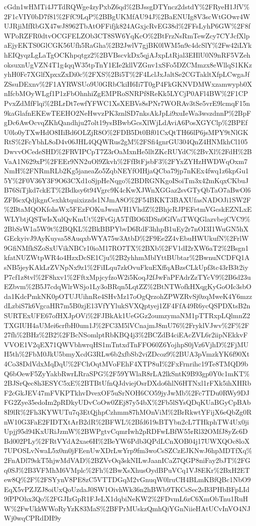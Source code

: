 \documentclass[12pt,letterpaper]{article}
\begin{document}
{\begin{landscape}
\begin{center}
cGdn1wHMTi4J7TdRQWge4zyPxbZ6qd\%2BJssgDTYncz2dstdY\%2FRyeH1JfV\%2F1cVIY0bD7f81\%2FfC9LqP\%2BBgUKMfAU94J\%2BaENUIg8V3scWtGOwr4WUJRjiMfRbGX47wJ8962TbAtOFFifjk824AGxjcRvEG38d\%2FFsLyhP6GW\%2F8fWPoRZFR0dtvOCGFELZOb3CT8SW6YqKcO\%2BtFrzNsRmTewZcy7CYJcfXlpaEjyEKTS0GlCGK56Ufh5RaGha\%2B2JwlV7gjBK0lWM5n9c4dcSlY\%2Fw42iLYkhEIQyqzLgLaTgOCKhpqtgz2\%2BVBscvkDx5qjAJxpLtRjal3EHlU0N9nRF5VZehoksuxnUgVZN4T1g4qqW35tpTnY1EIe2kllVZGnv1xSFo5DZCMmzx8eWllqS1KKzyhH0Fc7XGlfXpxxZxDi0c\%2FXS\%2Bi5T\%2F4LclJxJaltSe2CGTakltXfpLCwgaJfZSsuDExnv\%2F1AYRWSUo9U0GRbCkiH6Ii7T0gP4FkGKNVDMWxzamwypb0XnIfcbMOyWLgf1P1zFbOhnhiZgEMPRoSNRPf8ReKk5LYCjP0AFl4BW\%2F1CPPvxZdMfFlqi\%2BLrDt7ewfYFWC1XsXEBVs8sPNr7WORAv3tSe5vrE9lcmqF15n9kaGlafnEKEwTEEHO2NeHwvzPK3znlSD7nksAkJpLi9xuIeWa3wszdnnP\%2BpFgDc6AwOcvqZKhQandhju27olt19ysBBwbGcsXlWjLdAviA6PosXGYClp\%2BPEfU0lo0yTXwHdO8IIiBd6OLZjR8O\%2FDB5Dt0Bf01CxQtTH66lP6jsMPY9tNlGKRtS\%2FcYbhL8oD4v06JHL4QQWRus2gM\%2FSfi4gnrGU304QnZ4HNMkhCl105DwvvOCedeSHD\%2FRVIPCpT7Z3rOaMxnHe5lltZKcRUYdC\%2BvXl\%2FdH\%2BVaA1N629xP\%2FEEr9NN2uOl9Zkvh\%2FfBtFjsbF3\%2FYxZYHzHWDWqOxm7NmH\%2FNRmRLb2Kg5janeaZo5ZqbNEYfOIHjaQCba79jp7nKEx4fwq1z6kpGu15Y\%2F0V36Y3F9O63CXd1oSjpHeNqgo\%2BDRGNKgoISoiTm3x42mKqxCKbuJB76SiTjkd7ckET\%2Bdksy6t94Vgrc9K4cKwXJWnXGGaz2svGTyQbTaO7aBwOl6ZFI6cxQdjkgnCexhktquixizzds1NJmA8O\%2F54BKKT3BAXUfasNADOJi1SW2F\%2BtaMQOKfohsWx5FEzFOKuJwsnVH1VhdZ\%2BhjcRJPEFetmVGcskEZNLxEWLYbtjQSTwIsXulQvKmUt\%2FvGjA5TfBO63DSn0GfVaiTWQGlazvbejCVC9\%2BbSrW1a5W9t\%2BQKL\%2BkBBPYbvD6RdF3hhpB1uEy2r7nOI3I1WuGN5hXGEckyivJ9AyKuysa58AuqxbWYA75w3AtbD\%2F9Ee2Z4vEbuHWUkufN\%2FrlW9GfiNMfkSZoSxUVikNBCr10ioM17RO7TX\%2BXb\%2FV1dI2rXW6aT2\%2Bsgn1kfatNUZWtpWR4o4HzxDcSE1Cju\%2B2yhhmMblYttBUbtar\%2BwnuNCDFQ1AsNB5jeyKAkLrZVNpNx9z1\%2FiILqu7zkOvuFkuEXffqABzsCLkUpf3tc43rB3t2iyP7cf1z8tvl\%2F8hxv1\%2FftxMpjcyfzoW2i5KoqJ2fJwFaPFAdrZzTYcV9\%2B6d23uEZbvm\%2B5J7cdqWlrWSjo1Ly3oBRqn5LqtZZ\%2BtNTWofkHXqgKyGoOIc3sbOda1KdcPmkNK0pOTUJUihnRe4SHvMz17oOgQrzohZPWZRvSj0zqMweK4Y6mzzdLzbiS7k6VgcaHR7m5B0zjE13VfYYlukSVXQptyej1ZF4FfA49R6ycQSPDXtsB2nSURTExUFE67ofHXJpOVi\%2FJBkAk1UeGGz2oumzymaNM1pTTRxpLQlmnZ2TXGIUH4aUMei6crfbH0um1J\%2FC3M5lVCnajmJ8mU76\%2FryklVJwv\%2F\%2F27fh\%2BHz\%2B2\%2FBcNSomlptRbKBQ4j3\%2BCZdB4ciEAcZVL6r2iipNEkkvFVVOE1V2qEX71QWVbhwrqHS1mTntxdTnFFO60Z6YojhpS0jVz6VjhD\%2FjMUH5th\%2FbM0JkU5bmyXcdG3RLw6b2xfbSb2viZDcoz9\%2BUA3pVmzkYK6f90Xt4Co38DdVdxMqDqU\%2FChOqtMVoFEhF4XTP8uI\%2FxFrnrihc19Te8TMQD9bQ6bOewF5ZyYakbRwrLRraSPG\%2F59YWlaR8rLA2lkSntK9B93gp0Y0c1mKT\%2BJSrQec8h3ESYC5xE\%2BTBtUfnQJdviejOsrDXdo6hlN6HTNxl1rFXk5ihXHRbF2cGkJEV47mFVKPTkhvDvexOF5uSrNOH6CO59jyJwMb\%2Fc7TDu0RWy9DJFG2Zye35edoIm2pRDkyUDvCoOw0ZEj87y54bX\%2Fb5lSYsQDqKUaBGyCpBAb8I9lR\%2Fh3KYWUTu7q3EtQjhpCzhmm87hMOnViM\%2BrRkwtYFijX6eQbZg0RnW10G3FaE2FIDTXtArB2dR\%2BFWL\%2Bfd619sBTYbn2cL7THkphTW4Ux0jiUpjj95d94KxURiJzmW\%2BWPgtvCqmrIwh2pRDFwLBfW55rRl32OMfJ8yZc6DBd002PLy\%2FRtVYdA2xae6H\%2BeYW6Pdb3QPdLCnXOB04j17UWXQOc8loX7UPOSLvNwaL5x0m0jFEenUwXDrLwYrp9fm3woCsSZCzEJKNwJ6hpMDTfXq\%2FnADl79skT5hjwMdVAD\%2BZVvOq3skNILwJaanICaZ7QGP8niFay2bJT\%2FGq0SJ\%2B3VFMhM6VMplc\%2Fh\%2BwXsXhusOydBPuVCq1VJ8EKr\%2BxH2ETew8Q\%2F\%2FSYynV8PE8zC5VTTDGqM2vGnuqW0lruCH4BLmKBfQBc1NbO9EqX5vPZJZJ8oiUxQoUzdaJ0SW1OivhWk36n2hBWb9TKCsSec2sB3PHbBFpLId9fPPOhx3Qo\%2FGJIzGpR1FJeLX1dqbiNeKW2\%2FDvmL6zC6XmObTnu1RuHW\%2FwUkkWWoRyYzK83MaS\%2BFPrMUskzQmhQiYGnNiieHAtUCvInVO4NJWj0wqCPRdDH9y
\end{center}
\end{landscape}}
\end{document}
